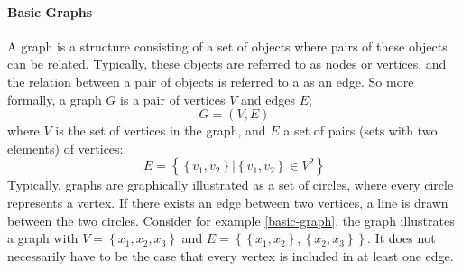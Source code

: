 \paragraph{Basic Graphs}
A graph is a structure consisting of a set of objects where pairs of these objects can be related. Typically, these objects are referred to as nodes or vertices, and the relation between a pair of objects is referred to a as an edge. So more formally, a graph $G$ is a pair of vertices $V$ and edges $E$;
\begin{equation}
	G = (V, E)
\end{equation}
where $V$ is the set of vertices in the graph, and $E$ a set of pairs (sets with two elements) of vertices:
\begin{equation}
	E = \left\{\left\{v_1, v_2\right\} | \left\{v_1, v_2\right\} \in V^2\right\}
	\label{undirected-edges}
\end{equation}
Typically, graphs are graphically illustrated as a set of circles, where every circle represents a vertex. If there exists an edge between two vertices, a line is drawn between the two circles. Consider for example \cref{basic-graph}, the graph illustrates a graph with $V = \left\{x_1, x_2, x_3\right\}$ and $E = \left\{\left\{x_1, x_2\right\}, \left\{x_2, x_3\right\}\right\}$. It does not necessarily have to be the case that every vertex is included in at least one edge.

